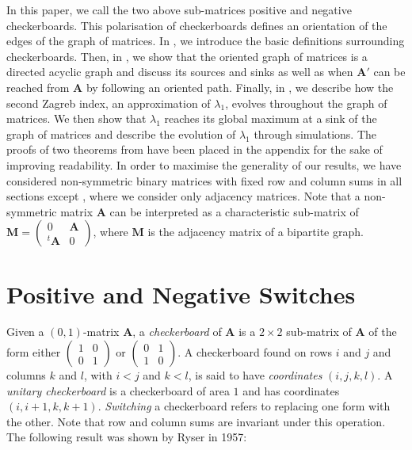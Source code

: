 \documentclass{article}
\renewcommand{\ll}{\lambda_1}
\newcommand{\A}{\mathbf A}
\begin{document}
In this paper, we call the two above sub-matrices positive and negative checkerboards. This polarisation of checkerboards defines an orientation of the edges of the graph of matrices. In , we introduce the basic definitions surrounding checkerboards. Then, in , we show that the oriented graph of matrices is a directed acyclic graph and discuss its sources and sinks as well as when $\A'$ can be reached from $\A$ by following an oriented path. Finally, in , we describe how the second Zagreb index, an approximation of $\ll$, evolves throughout the graph of matrices. We then show that $\ll$ reaches its global maximum at a sink of the graph of matrices and describe the evolution of $\ll$ through simulations. The proofs of two theorems from  have been placed in the appendix for the sake of improving readability. In order to maximise the generality of our results, we have considered non-symmetric binary matrices with fixed row and column sums in all sections except , where we consider only adjacency matrices. Note that a non-symmetric matrix $\A$ can be interpreted as a characteristic sub-matrix of $\mathbf M=\begin{pmatrix}
0&\A\\
^t\A&0
\end{pmatrix}$, where $\mathbf M$ is the adjacency matrix of a bipartite graph.

\section{Positive and Negative Switches}\label{sec:Pos-Neg}


Given a $(0,  1)$-matrix $\A$, a \emph{checkerboard} of $\A$ is a $2\times 2$ sub-matrix of $\A$ of the form either $\begin{pmatrix}
1 & 0 \\
0 & 1
\end{pmatrix}$
or $\begin{pmatrix}
0 & 1 \\
1 & 0
\end{pmatrix}$. A checkerboard found on rows $i$ and $j$ and columns $k$ and $l$, with $i<j$ and $k<l$, is said to have \emph{coordinates} $(i,j,k,l)$. A \emph{unitary checkerboard} is a checkerboard of area $1$ and has  coordinates $(i,i+1,k,k+1)$.  \emph{Switching} a checkerboard refers to replacing one form with the other. Note that row and column sums are invariant under this operation. The following result was shown by Ryser in 1957:
\end{document}
